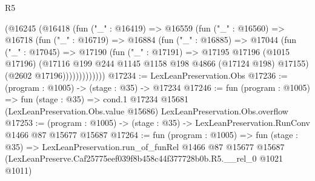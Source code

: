 \begin{lexlean}{R5}
\begin{coremodule}
            (@16245
              (@16418
                (fun ("_" : @16419) =>
                @16559
                  (fun ("_" : @16560) =>
                  @16718
                    (fun ("_" : @16719) =>
                    @16884
                      (fun ("_" : @16885) =>
                      @17044
                        (fun ("_" : @17045) =>
                        @17190
                          (fun ("_" : @17191) =>
                          @17195
                            @17196
                            (@1015 @17196)
                            (@17116 @199 @244 @1145 @1158 @198 @4866 (@17124 @198) @17155)
                            (@2602 @17196)))))))))))))
@17234 := LexLeanPreservation.Obs
@17236 := (program : @1005) -> (stage : @35) -> @17234
@17246 := fun (program : @1005) =>
  fun (stage : @35) =>
  cond.{1} @17234 @15681 (LexLeanPreservation.Obs.value @15686) LexLeanPreservation.Obs.overflow
@17253 := (program : @1005) -> (stage : @35) -> LexLeanPreservation.RunConv @1466 @87 @15677 @15687
@17264 := fun (program : @1005) =>
  fun (stage : @35) =>
  LexLeanPreservation.run_of_funRel
    @1466
    @87
    @15677
    @15687
    (LexLeanPreserve.Caf25775eef039f8b458c44f377728b0b.R5.__rel_0 @1021 @1011)
\end{coremodule}
\end{lexlean}
